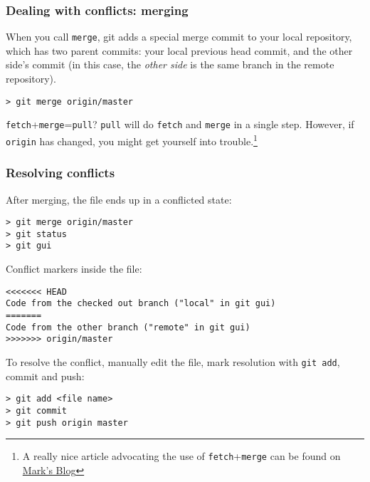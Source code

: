
\begin{frame}[fragile]
	\frametitle{Dealing with conflicts: merging}
	
	When you call \texttt{merge}, git adds a special merge commit to your local repository, which has two parent commits: your local previous head commit, and the other side's commit (in this case, the \textit{other side} is the same branch in the remote repository).
	\begin{verbatim}
> git merge origin/master
	\end{verbatim}
	
	\begin{block}{\texttt{fetch}+\texttt{merge}=\texttt{pull}?}
	\texttt{pull} will do \texttt{fetch} and \texttt{merge} in a single step. However, if \texttt{origin} has changed, you might get yourself into trouble.\footnote{A really nice article advocating the use of \texttt{fetch}+\texttt{merge} can be found on \href{http://longair.net/blog/2009/04/16/git-fetch-and-merge/}{Mark's Blog}} 
	\end{block}
	
\end{frame}

\begin{frame}[fragile]
	\frametitle{Resolving conflicts}
	
	After merging, the file ends up in a conflicted state:
	\begin{verbatim}
> git merge origin/master
> git status
> git gui
	\end{verbatim}	
	
	Conflict markers inside the file:
	\begin{verbatim}
<<<<<<< HEAD
Code from the checked out branch ("local" in git gui) 
=======
Code from the other branch ("remote" in git gui)
>>>>>>> origin/master
	\end{verbatim}

	To resolve the conflict, manually edit the file, mark resolution with \texttt{git add}, commit and push:
	\begin{verbatim}
> git add <file name>
> git commit
> git push origin master
	\end{verbatim}
	
\end{frame}


